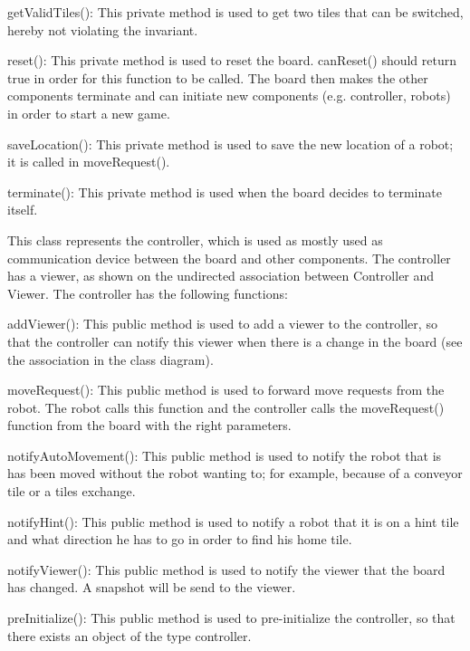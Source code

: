 \begin{description}
\begin{description}
            \item getValidTiles(): This private method is used to get two tiles that can be switched, hereby not violating the invariant.
            \item reset(): This private method is used to reset the board. canReset() should return true in order for this function to be called. The board then makes the other components terminate and can initiate new components (e.g. controller, robots) in order to start a new game.
            \item saveLocation(): This private method is used to save the new location of a robot; it is called in moveRequest().
            \item terminate(): This private method is used when the board decides to terminate itself.
        \end{description}
		\item[Controller] This class represents the controller, which is used as mostly used as communication device between the board and other components. The controller has a viewer, as shown on the undirected association between Controller and Viewer. The controller has the following functions:
        \begin{description}
            \item addViewer(): This public method is used to add a viewer to the controller, so that the controller can notify this viewer when there is a change in the board (see the association in the class diagram).
            \item moveRequest(): This public method is used to forward move requests from the robot. The robot calls this function and the controller calls the moveRequest() function from the board with the right parameters.
            \item notifyAutoMovement(): This public method is used to notify the robot that is has been moved without the robot wanting to; for example, because of a conveyor tile or a tiles exchange.
            \item notifyHint(): This public method is used to notify a robot that it is on a hint tile and what direction he has to go in order to find his home tile.
            \item notifyViewer(): This public method is used to notify the viewer that the board has changed. A snapshot will be send to the viewer.
            \item preInitialize(): This public method is used to pre-initialize the controller, so that there exists an object of the type controller.

\end{description}
\end{description}

